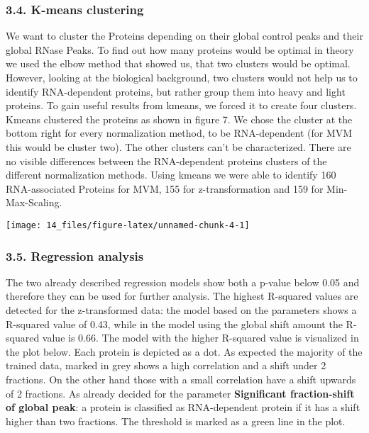 \documentclass[
  12pt,
]{article}
\begin{document}
\hypertarget{k-means-clustering-1}{%
\subsubsection{3.4. K-means clustering}\label{k-means-clustering-1}}

We want to cluster the Proteins depending on their global control peaks
and their global RNase Peaks. To find out how many proteins would be
optimal in theory we used the elbow method that showed us, that two
clusters would be optimal. However, looking at the biological
background, two clusters would not help us to identify RNA-dependent
proteins, but rather group them into heavy and light proteins. To gain
useful results from kmeans, we forced it to create four clusters. Kmeans
clustered the proteins as shown in figure 7. We chose the cluster at the
bottom right for every normalization method, to be RNA-dependent (for
MVM this would be cluster two). The other clusters can't be
characterized. There are no visible differences between the
RNA-dependent proteins clusters of the different normalization methods.
Using kmeans we were able to identify 160 RNA-associated Proteins for
MVM, 155 for z-transformation and 159 for Min-Max-Scaling.

\texttt{[image: 14\_files/figure-latex/unnamed-chunk-4-1]}

\hypertarget{regression-analysis-1}{%
\subsubsection{3.5. Regression analysis}\label{regression-analysis-1}}

The two already described regression models show both a p-value below
0.05 and therefore they can be used for further analysis. The highest
R-squared values are detected for the z-transformed data: the model
based on the parameters shows a R-squared value of 0.43, while in the
model using the global shift amount the R-squared value is 0.66. The
model with the higher R-squared value is visualized in the plot below.
Each protein is depicted as a dot. As expected the majority of the
trained data, marked in grey shows a high correlation and a shift under
2 fractions. On the other hand those with a small correlation have a
shift upwards of 2 fractions. As already decided for the parameter
\textbf{Significant fraction-shift of global peak}: a protein is
classified as RNA-dependent protein if it has a shift higher than two
fractions. The threshold is marked as a green line in the plot.
\end{document}
